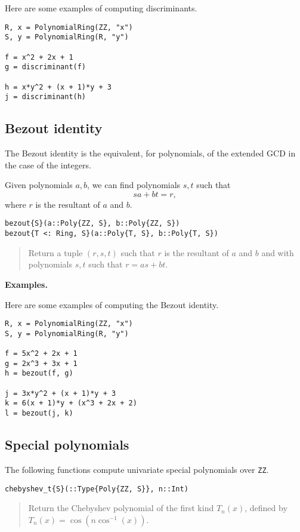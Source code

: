 \documentclass[a4paper,10pt]{article}
\newcommand{\code}{\lstinline}
\newcommand{\desc}[1]{\vspace{-3mm}\begin{quote}#1\end{quote}}
\begin{document}
{{{Here are some examples of computing discriminants.

\begin{lstlisting}
R, x = PolynomialRing(ZZ, "x")
S, y = PolynomialRing(R, "y")

f = x^2 + 2x + 1
g = discriminant(f)

h = x*y^2 + (x + 1)*y + 3
j = discriminant(h)
\end{lstlisting}

\subsection{Bezout identity}

The Bezout identity is the equivalent, for polynomials, of the extended GCD
in the case of the integers.

Given polynomials $a, b$, we can find polynomials $s, t$ such that
$$sa + bt = r,$$
where $r$ is the resultant of $a$ and $b$.

\begin{lstlisting}
bezout{S}(a::Poly{ZZ, S}, b::Poly{ZZ, S})
bezout{T <: Ring, S}(a::Poly{T, S}, b::Poly{T, S})
\end{lstlisting}

\desc{Return a tuple $(r, s, t)$ such that $r$ is the resultant of $a$ and $b$
and with polynomials $s, t$ such that $r = as + bt$.}

\textbf{Examples.}

Here are some examples of computing the Bezout identity.

\begin{lstlisting}
R, x = PolynomialRing(ZZ, "x")
S, y = PolynomialRing(R, "y")

f = 5x^2 + 2x + 1
g = 2x^3 + 3x + 1
h = bezout(f, g)

j = 3x*y^2 + (x + 1)*y + 3
k = 6(x + 1)*y + (x^3 + 2x + 2)
l = bezout(j, k)
\end{lstlisting}

\subsection{Special polynomials}

The following functions compute univariate special polynomials over \code{ZZ}.

\begin{lstlisting}
chebyshev_t{S}(::Type{Poly{ZZ, S}}, n::Int)
\end{lstlisting}

\desc{Return the Chebyshev polynomial of the first kind $T_n(x)$, defined by 
$T_n(x) = \cos(n \cos^{-1}(x))$.}

}}}
\end{document}
